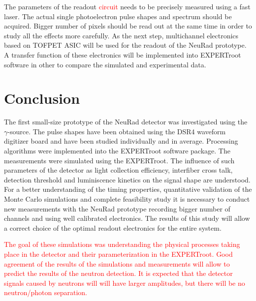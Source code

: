 \documentclass{webofc}
\newcommand{\er}{\textmd{EXPERTroot}}
\newcommand{\red}[1]{\textcolor{red}{#1}}
\begin{document}
The parameters of the readout \red{circuit} needs to be precisely measured using a fast laser. The actual single photoelectron pulse shapes and spectrum should be acquired. Bigger number of pixels should be read out at the same time in order to study all the effects more carefully. As the next step, multichannel electronics based on TOFPET ASIC \cite{petsys} will be used for the readout of the NeuRad prototype. A transfer function of these electronics will be implemented into \er\, software in other to compare the simulated and experimental data.


\section{Conclusion}
		
	The first small-size prototype of the NeuRad detector was investigated using the $\gamma$-source. The pulse shapes have been obtained using the DSR4 waveform digitizer board and have been studied individually and in average. Processing algorithms were implemented into the EXPERTroot software package. The measurements were simulated using the \er. The influence of such parameters of the detector as light collection efficiency, interfiber cross talk, detection threshold and luminiscence kinetics on the signal shape are understood. For a better understanding of the timing properties, quantitative validation of the Monte Carlo simulations and complete feasibility study it is necessary to conduct new measurements with the NeuRad prototype recording bigger number of channels and using well calibrated electronics.
	The results of this study will allow a correct choice of the optimal readout electronics for the entire system.
	
	\red{The goal of these simulations was understanding the physical processes taking place in the detector and their parameterization in the \er. Good agreement of the results of the simulations and measurements will allow to predict the results of the neutron detection. It is expected that the detector signals caused by neutrons will will have larger amplitudes, but there will be no neutron/photon separation.} 
	
	
\end{document}
